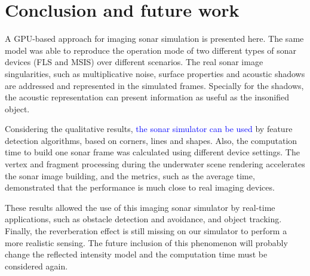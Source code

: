 \documentclass[final,5p,times]{elsarticle}
\begin{document}


\section{Conclusion and future work}
\label{conclusion}

A GPU-based approach for imaging sonar simulation is presented here.
The same model was able to reproduce the operation mode of two different
types of sonar devices (FLS and MSIS) over different scenarios. The real
sonar image singularities, such as multiplicative noise, surface
properties and acoustic shadows are addressed and represented in the
simulated frames. Specially for the shadows, the acoustic representation
can present information as useful as the insonified object.

Considering
the qualitative results, \textcolor{blue}{the sonar simulator can be used} by feature detection
algorithms, based on corners, lines and shapes. Also, the computation time
to build one sonar frame was calculated using different device settings.
The vertex and fragment processing during the underwater scene rendering
accelerates the sonar image building, and the metrics, such as the average
time, demonstrated that the performance is much close to real imaging
devices.

These results allowed the use of this imaging sonar simulator
by real-time applications, such as obstacle detection and avoidance, and
object tracking. Finally, the reverberation effect is still missing on
our simulator to perform a more realistic sensing. The future inclusion
of this phenomenon will probably change the reflected intensity model
and the computation time must be considered again.
\end{document}
